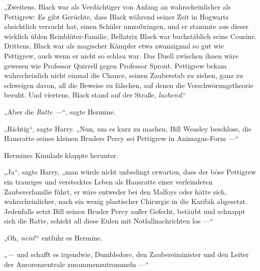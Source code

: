 „Zweitens, Black war als Verdächtiger von Anfang an wahrscheinlicher als Pettigrew: Es gibt Gerüchte, dass Black während seiner Zeit in Hogwarts absichtlich versucht hat, einen Schüler umzubringen, und er stammte aus dieser wirklich üblen Reinblüter-Familie, Bellatrix Black war buchstäblich seine Cousine. Drittens, Black war als magischer Kämpfer etwa zwanzigmal so gut wie Pettigrew, auch wenn er nicht so schlau war. Das Duell zwischen ihnen wäre gewesen wie Professor Quirrell gegen Professor Sprout. Pettigrew bekam wahrscheinlich nicht einmal die Chance, seinen Zauberstab zu ziehen, ganz zu schweigen davon, all die Beweise zu fälschen, auf denen die Verschwörungstheorie beruht. Und viertens, Black stand auf der Straße, \emph{lachend}.“

„Aber die \emph{Ratte —}“, sagte Hermine.

„Richtig“, sagte Harry.
„Nun, um es kurz zu machen, Bill Weasley beschloss, die Hausratte seines kleinen Bruders Percy sei Pettigrew in Animagus-Form —“

Hermines Kinnlade klappte herunter.

„Ja“, sagte Harry, „man würde nicht unbedingt erwarten, dass der böse Pettigrew ein trauriges und verstecktes Leben als Hausratte einer verfeindeten Zaubererfamilie führt, er wäre entweder bei den Malfoys oder hätte sich, wahrscheinlicher, nach ein wenig plastischer Chirurgie in die Karibik abgesetzt. Jedenfalls setzt Bill seinen Bruder Percy außer Gefecht, betäubt und schnappt sich die Ratte, schickt all diese Eulen mit Notfallnachrichten los —“

„Oh, \emph{nein}!“ entfuhr es Hermine.

„— und schafft es irgendwie, Dumbledore, den Zaubereiminister und den Leiter der Aurorenzentrale zusammenzutrommeln —“

